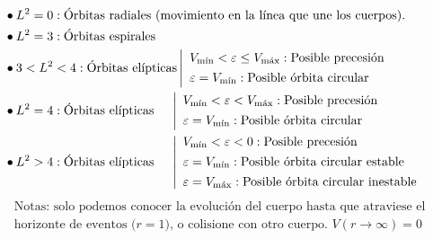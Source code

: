 \begin{align*}
    &\bullet L^2 =0: \text{Órbitas radiales (movimiento en la línea que une los cuerpos).}\\
    &\bullet L^2=3: \text{Órbitas espirales}\\
    &\bullet 3<L^2<4: \text{Órbitas elípticas}
    \left|
\begin{array}{l}
V_{\text{mín}}<\varepsilon\leq V_{\text{máx}}: \text{Posible precesión}\vspace{4pt}\\
\varepsilon=V_{\text{mín}}: \text{Posible órbita circular}\\
\end{array}
\right.\\
    &\bullet L^2=4: \text{Órbitas elípticas}
        \hspace{13pt}
    \left|
\begin{array}{l}
V_{\text{mín}}<\varepsilon<V_{\text{máx}}: \text{Posible precesión}\vspace{4pt}\\
\varepsilon=V_{\text{mín}}: \text{Posible órbita circular}\\
\end{array}
\right.\\
    &\bullet L^2>4: \text{Órbitas elípticas}
    \hspace{13pt}
    \left|
\begin{array}{l}
V_{\text{mín}}<\varepsilon<0: \text{Posible precesión}\vspace{4pt}\\
\varepsilon=V_{\text{mín}}: \text{Posible órbita circular estable}\vspace{4pt}\\
\varepsilon=V_{\text{máx}}: \text{Posible órbita circular inestable}\\
\end{array}
\right.
\end{align*}
\begin{align*}
    &\text{Notas: solo podemos conocer la evolución del cuerpo hasta que atraviese el}\\
    &\text{horizonte de eventos ($r=1$), o colisione con otro cuerpo. $V(r\rightarrow\infty)=0$}
\end{align*}
